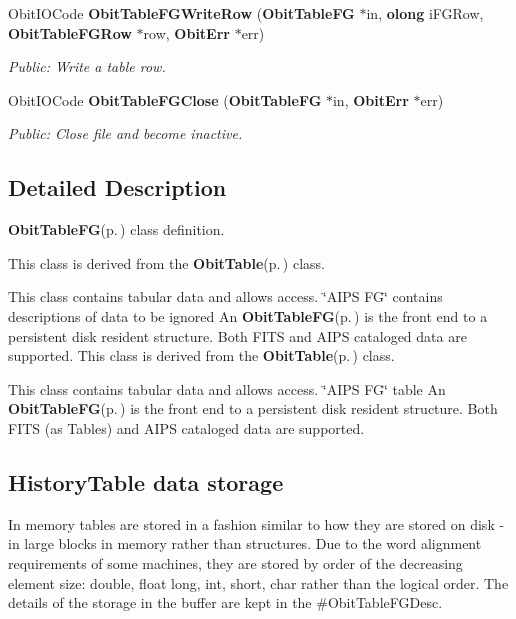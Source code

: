 \begin{CompactItemize}
Obit\-IOCode {\bf Obit\-Table\-FGWrite\-Row} ({\bf Obit\-Table\-FG} $\ast$in, {\bf olong} i\-FGRow, {\bf Obit\-Table\-FGRow} $\ast$row, {\bf Obit\-Err} $\ast$err)
\begin{CompactList}\small\item\em Public: Write a table row. \item\end{CompactList}\item 
Obit\-IOCode {\bf Obit\-Table\-FGClose} ({\bf Obit\-Table\-FG} $\ast$in, {\bf Obit\-Err} $\ast$err)
\begin{CompactList}\small\item\em Public: Close file and become inactive. \item\end{CompactList}\end{CompactItemize}


\subsection{Detailed Description}
{\bf Obit\-Table\-FG}{\rm (p.\,\pageref{structObitTableFG})} class definition. 

This class is derived from the {\bf Obit\-Table}{\rm (p.\,\pageref{structObitTable})} class.

This class contains tabular data and allows access. \char`\"{}AIPS FG\char`\"{} contains descriptions of data to be ignored An {\bf Obit\-Table\-FG}{\rm (p.\,\pageref{structObitTableFG})} is the front end to a persistent disk resident structure. Both FITS and AIPS cataloged data are supported. This class is derived from the {\bf Obit\-Table}{\rm (p.\,\pageref{structObitTable})} class.

This class contains tabular data and allows access. \char`\"{}AIPS FG\char`\"{} table An {\bf Obit\-Table\-FG}{\rm (p.\,\pageref{structObitTableFG})} is the front end to a persistent disk resident structure. Both FITS (as Tables) and AIPS cataloged data are supported.\subsection{History\-Table data storage}\label{ObitTableWX_8h_TableDataStorage}
In memory tables are stored in a fashion similar to how they are stored on disk - in large blocks in memory rather than structures. Due to the word alignment requirements of some machines, they are stored by order of the decreasing element size: double, float long, int, short, char rather than the logical order. The details of the storage in the buffer are kept in the \#Obit\-Table\-FGDesc.

